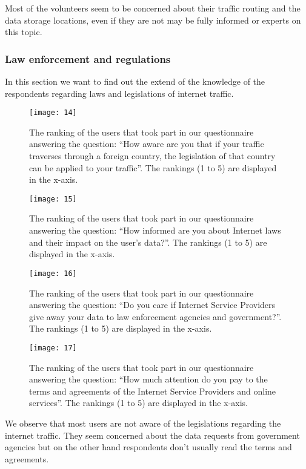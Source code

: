 Most of the volunteers  seem to be concerned about their traffic routing and the 
data  storage locations, even if they are not may be fully informed or experts 
on this topic. 

\subsubsection{Law enforcement and regulations}

In this section we want to find out the extend of the knowledge of the 
respondents regarding laws and legislations of internet traffic.

\begin{figure}[H]
\centering
\texttt{[image: 14]}
\caption{The ranking of the users that took part in our questionnaire answering
the question: ``How aware are you that if your traffic traverses through a 
foreign country, the legislation of that country can be applied to your 
traffic''. The rankings (1 to 5) are displayed in the x-axis.}
\end{figure}

\begin{figure}[H]
\centering
\texttt{[image: 15]}
\caption{The ranking of the users that took part in our questionnaire answering
the question: ``How informed are you about Internet laws and their impact on the 
user's data?''. The rankings (1 to 5) are displayed in the x-axis.}
\end{figure}

\begin{figure}[H]
\centering
\texttt{[image: 16]}
\caption{The ranking of the users that took part in our questionnaire answering
the question: ``Do you care if Internet Service Providers give away your data to 
law enforcement agencies and government?''. The
rankings (1 to 5) are displayed in the x-axis.}
\end{figure}

\begin{figure}[H]
\centering
\texttt{[image: 17]}
\caption{The ranking of the users that took part in our questionnaire answering
the question: ``How much attention do you pay to the terms and agreements of the 
Internet Service Providers and online services''. The rankings (1 to 5) are 
displayed in the x-axis.}
\end{figure}

We observe that most users are not aware of the legislations regarding the 
internet traffic. They seem concerned about the data requests from government 
agencies but on the other hand respondents don't usually read the terms and 
agreements.

